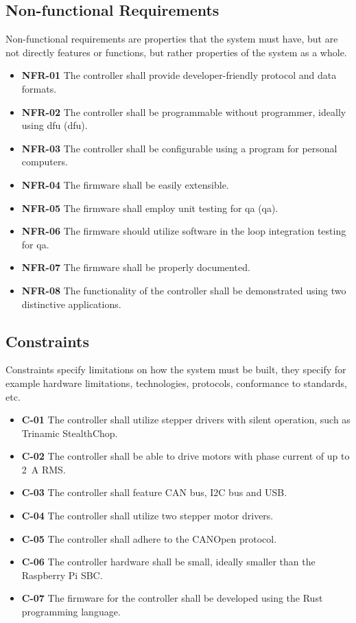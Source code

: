 \subsection{Non-functional Requirements}
\label{subsec:nonfunc_req}
Non-functional requirements are properties that the system must have, but are not directly features or functions, but rather properties of the system as a whole.

\begin{itemize}
    \item \textbf{NFR-01} The controller shall provide developer-friendly protocol and data formats.
    \item \textbf{NFR-02} The controller shall be programmable without programmer, ideally using \acs{dfu} (\acl{dfu}).
    \item \textbf{NFR-03} The controller shall be configurable using a program for personal computers.
    \item \textbf{NFR-04} The firmware shall be easily extensible.
    \item \textbf{NFR-05} The firmware shall employ unit testing for \acs{qa} (\acl{qa}).
    \item \textbf{NFR-06} The firmware should utilize software in the loop integration testing for \acs{qa}.
    \item \textbf{NFR-07} The firmware shall be properly documented.
    \item \textbf{NFR-08} The functionality of the controller shall be demonstrated using two distinctive applications.
\end{itemize}

\subsection{Constraints}
\label{subsec:constraints}
Constraints specify limitations on how the system must be built, they specify for example hardware limitations, technologies, protocols, conformance to standards, etc.

\begin{itemize}
    \item \textbf{C-01} The controller shall utilize stepper drivers with silent operation, such as Trinamic StealthChop\texttrademark.
    \item \textbf{C-02} The controller shall be able to drive motors with phase current of up to 2~A RMS.
    \item \textbf{C-03} The controller shall feature CAN bus, I2C bus and USB.
    \item \textbf{C-04} The controller shall utilize two stepper motor drivers.
    \item \textbf{C-05} The controller shall adhere to the CANOpen protocol.
    \item \textbf{C-06} The controller hardware shall be small, ideally smaller than the Raspberry Pi SBC.
    \item \textbf{C-07} The firmware for the controller shall be developed using the Rust programming language.
\end{itemize}
